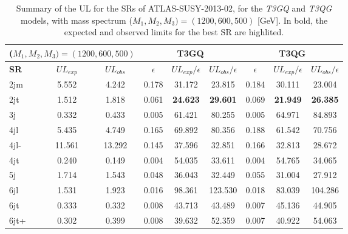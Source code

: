 \documentclass[a4paper,11pt]{article}
\begin{document}
\begin{table}[!b]
\centering
\renewcommand\arraystretch{1.3} 
\scriptsize
\begin{tabular}{ l c c    c c c  |  c c c  }
\toprule \toprule
\multicolumn{3}{c}{($M_1,M_2,M_3) = (1200,600,500)$} & \multicolumn{3}{c}{ \textbf{T3GQ}} & \multicolumn{3}{c}{ \textbf{T3QG}} \\  \toprule 
\textbf{SR} & $UL_{exp}$ & $UL_{obs}$ & $\epsilon$ &  $UL_{exp}/\epsilon$ & $UL_{obs}/\epsilon$ & $\epsilon$ & $UL_{exp}/ \epsilon$ & $UL_{obs}/ \epsilon$ \\
2jm & 5.552 &  4.242 &  0.178	 &31.172 &	23.815		 &0.184	 &30.111	 &23.004 \\
2jt  & 1.512  & 1.818 &  0.061& 	\textbf{24.623}	& \textbf{29.601}	& 	0.069	& \textbf{21.949}& 	\textbf{26.385} \\
3j &  0.332 &  0.433  & 0.005& 	61.421& 	80.255		& 0.005	& 64.971& 	84.893 \\ 
4jl  & 5.435 &  4.749  & 0.165	& 69.892	& 80.356	& 	0.188	& 61.542& 	70.756  \\
4jl-  & 11.561 &  13.292 &  0.145	& 37.596	& 32.851		& 0.166	& 32.813	& 28.672 \\
4jt  & 0.240  & 0.149  & 0.004& 	54.035	& 33.611		& 0.004	& 54.765& 	34.065  \\
5j  & 1.714  & 1.543  &0.048	& 36.043	& 32.449	& 	0.055	& 31.004	& 27.912  \\
6jl  & 1.531  & 1.923  & 0.016	& 98.361	& 123.530	& 	0.018	& 83.039	& 104.286 \\
6jt &  0.333  & 0.332 &  0.008	& 43.713& 	43.489	& 	0.007	& 45.136	& 44.905  \\
6jt+  & 0.302 &  0.399 & 0.008& 	39.632& 	52.359	& 	0.007	& 40.922	& 54.063 \\
\bottomrule \bottomrule
\end{tabular}
\caption{Summary of the UL for the SRs of ATLAS-SUSY-2013-02, for the \textit{T3GQ} and \textit{T3QG} models, with mass spectrum ($M_1,M_2,M_3) = (1200,600,500)$ [GeV]. In bold, the expected and observed limits for the best SR are highlited.}
\label{ATLAS02_UL_2}
\end{table}




\end{document}
